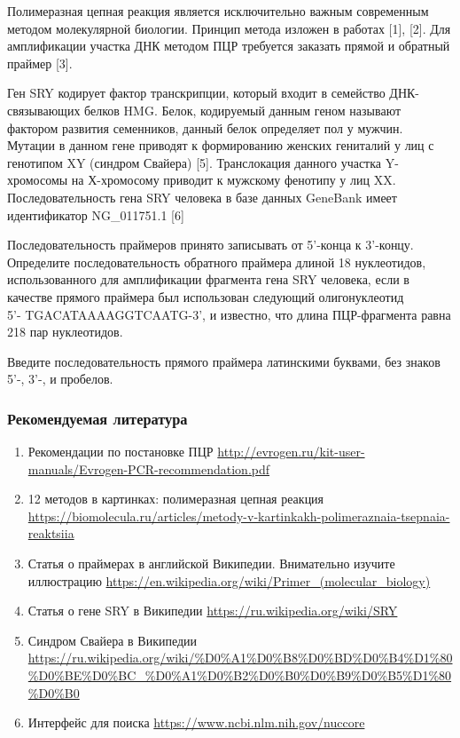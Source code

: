 
Полимеразная цепная реакция является исключительно важным современным методом молекулярной биологии. Принцип метода изложен в работах [1], [2]. Для амплификации участка ДНК методом ПЦР требуется заказать прямой и обратный праймер [3].

Ген SRY кодирует фактор транскрипции, который входит в семейство ДНК-связывающих белков HMG. 
Белок, кодируемый данным геном называют фактором развития семенников, данный белок определяет 
пол у мужчин. Мутации в данном гене приводят к формированию женских гениталий у лиц с генотипом 
XY (синдром Свайера) [5]. Транслокация данного участка Y-хромосомы на Х-хромосому приводит 
к мужскому фенотипу у лиц XX. Последовательность гена SRY человека в базе данных GeneBank 
имеет идентификатор NG\_011751.1 [6]

Последовательность праймеров принято записывать от 5'-конца к 3'-концу. Определите последовательность обратного праймера длиной 18 
нуклеотидов, использованного для амплификации фрагмента гена SRY человека, если в 
качестве прямого праймера был использован следующий олигонуклеотид\\ 5'- TGACATAAAAGGTCAATG-3', и известно, что длина ПЦР-фрагмента равна 218 пар нуклеотидов.

Введите последовательность прямого праймера латинскими буквами, без знаков 5'-, 3'-, и пробелов.

\subsubsection*{Рекомендуемая литература}

\begin{enumerate}
    \item Рекомендации по постановке ПЦР \url{http://evrogen.ru/kit-user-manuals/Evrogen-PCR-recommendation.pdf}
    \item 12 методов в картинках: полимеразная цепная реакция \url{https://biomolecula.ru/articles/metody-v-kartinkakh-polimeraznaia-tsepnaia-reaktsiia}
    \item Статья о праймерах в английской Википедии. Внимательно изучите иллюстрацию \url{https://en.wikipedia.org/wiki/Primer_(molecular_biology)}
    \item Статья о гене SRY в Википедии \url{https://ru.wikipedia.org/wiki/SRY}
    \item Синдром Свайера в Википедии \url{https://ru.wikipedia.org/wiki/%D0%A1%D0%B8%D0%BD%D0%B4%D1%80%D0%BE%D0%BC_%D0%A1%D0%B2%D0%B0%D0%B9%D0%B5%D1%80%D0%B0}
    \item Интерфейс для поиска \url{https://www.ncbi.nlm.nih.gov/nuccore}
\end{enumerate}